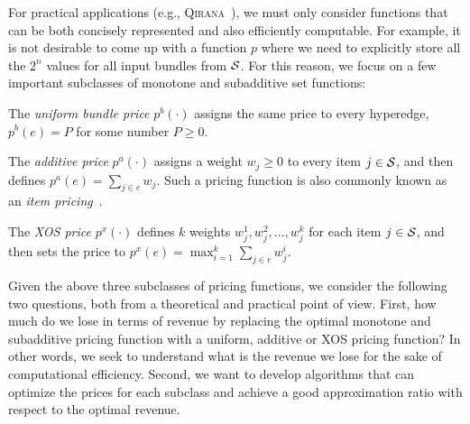 For practical applications (e.g., \textsc{Qirana}~\cite{deep2017qirana}), we must only consider functions that can be both concisely represented and also efficiently computable. For example, it is not desirable to come up with a function $p$ where we need to explicitly store all the $2^n$ values for all input bundles from $\mathcal{S}$.
For this reason, we focus on a few important subclasses of monotone and subadditive set functions:
%
\begin{packed_item}
\item The {\em uniform bundle price}  $p^b(\cdot)$ assigns the same price to every hyperedge, \ie $p^b(e) = P$ for some number $P \geq 0$.
%
\item The {\em additive price} $p^a(\cdot)$ assigns a weight $w_j \geq 0$ to every item $j \in \mathcal{S}$, and then defines
$p^a(e) = \sum_{j \in e} w_j$. Such a pricing function is also commonly known as an {\em item pricing}~\cite{}.
%
\item The {\em XOS price} $p^x(\cdot)$ defines $k$ weights $w_j^1, w_j^2, \dots, w_j^k$ for each item $j \in \mathcal{S}$, and then sets the price to $p^x(e) = \max_{i=1}^k \sum_{j \in e} w_j^i$.
\end{packed_item}

Given the above three subclasses of pricing functions, we consider the following two questions, both from a theoretical and practical point of view.
First, how much do we lose in terms of revenue by replacing the optimal monotone and subadditive pricing function with a uniform, additive or XOS pricing function? In other words, we seek to understand what is the revenue we lose for the sake of computational efficiency.
Second, we want to develop algorithms that can optimize the prices for each subclass and achieve a good approximation ratio with respect to the optimal revenue.


